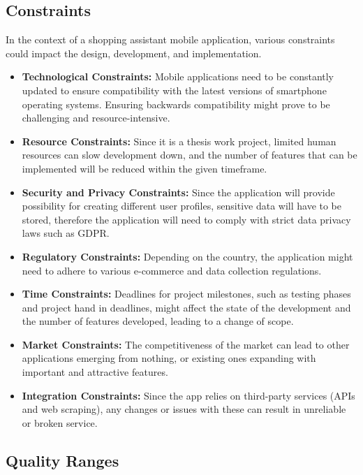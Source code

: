 \pagebreak

\subsection{Constraints}

In the context of a shopping assistant mobile application, various constraints could impact the design, development, and implementation.

\begin{itemize}
	\item \textbf{Technological Constraints:} Mobile applications need to be constantly updated to ensure compatibility with the latest versions of smartphone operating systems. Ensuring backwards compatibility might prove to be challenging and resource-intensive.
	\item \textbf{Resource Constraints:} Since it is a thesis work project, limited human resources can slow development down, and the number of features that can be implemented will be reduced within the given timeframe.
	\item \textbf{Security and Privacy Constraints:} Since the application will provide possibility for creating different user profiles, sensitive data will have to be stored, therefore the application will need to comply with strict data privacy laws such as GDPR.
	\item \textbf{Regulatory Constraints:} Depending on the country, the application might need to adhere to various e-commerce and data collection regulations.
	\item \textbf{Time Constraints:} Deadlines for project milestones, such as testing phases and project hand in deadlines, might affect the state of the development and the number of features developed, leading to a change of scope.
	\item \textbf{Market Constraints:} The competitiveness of the market can lead to other applications emerging from nothing, or existing ones expanding with important and attractive features.
	\item \textbf{Integration Constraints:} Since the app relies on third-party services (APIs and web scraping), any changes or issues with these can result in unreliable or broken service.
\end{itemize}

\subsection{Quality Ranges}

